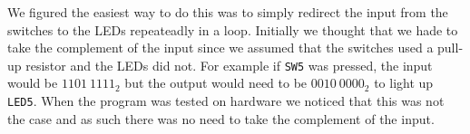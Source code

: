 We figured the easiest way to do this was to simply redirect the input from the switches to the LEDs repeateadly in a loop. Initially we thought that we hade to take the complement of the input since we assumed that the switches used a pull-up resistor and the LEDs did not. For example if \texttt{SW5} was pressed, the input would be ${1101\ 1111}_2$ but the output would need to be ${0010\ 0000}_2$ to light up \texttt{LED5}. When the program was tested on hardware we noticed that this was not the case and as such there was no need to take the complement of the input.
